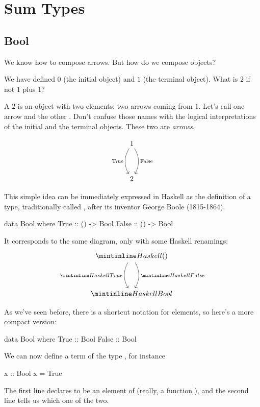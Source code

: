 \documentclass[DaoFP]{subfiles}
\begin{document}
\setcounter{chapter}{3}

\chapter{Sum Types}

\section{Bool}

We know how to compose arrows. But how do we compose objects?

 We have defined $0$ (the initial object) and $1$ (the terminal object). What is $2$ if not $1$ plus $1$?
 
A $2$ is an object with two elements: two arrows coming from $1$. Let's call one arrow  and the other . Don't confuse those names with the logical interpretations of the initial and the terminal objects. These two are \emph{arrows}. 

\[
 \begin{tikzcd}
 1
 \arrow[dd, bend right, "\text{True}"']
 \arrow[dd, bend left, "\text{False}"]
 \\
 \\
2
 \end{tikzcd}
\]

This simple idea can be immediately expressed in Haskell as the definition of a type, traditionally called , after its inventor George Boole (1815-1864).

\begin{haskell}
data Bool where
  True  :: () -> Bool
  False :: () -> Bool
\end{haskell}
It corresponds to the same diagram, only with some Haskell renamings:
\[
 \begin{tikzcd}
 \hask{()}
 \arrow[dd, bend right, "\hask{True}"']
 \arrow[dd, bend left, "\hask{False}"]
 \\
 \\
\hask{Bool}
 \end{tikzcd}
\]

As we've seen before, there is a shortcut notation for elements, so here's a more compact version:

\begin{haskell}
data Bool where
  True  :: Bool
  False :: Bool
\end{haskell}

We can now define a term of the type , for instance
\begin{haskell}
x :: Bool
x = True
\end{haskell}
The first line declares  to be an element of  (really, a function ), and the second line tells us which one of the two.
\end{document}

